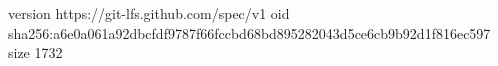 version https://git-lfs.github.com/spec/v1
oid sha256:a6e0a061a92dbcfdf9787f66fccbd68bd895282043d5ce6cb9b92d1f816ec597
size 1732
